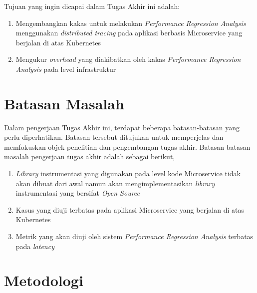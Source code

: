 Tujuan yang ingin dicapai dalam Tugas Akhir ini adalah:
\begin{enumerate}
	\item Mengembangkan kakas untuk melakukan \textit{Performance Regression Analysis} menggunakan \textit{distributed tracing}  pada aplikasi berbasis Microservice yang berjalan di atas Kubernetes
	\item Mengukur \textit{overhead} yang diakibatkan oleh kakas \textit{Performance Regression Analysis} pada level infrastruktur
\end{enumerate}


\section{Batasan Masalah}

Dalam pengerjaan Tugas Akhir ini, terdapat beberapa batasan-batasan yang perlu diperhatikan. Batasan tersebut ditujukan untuk memperjelas dan memfokuskan objek penelitian dan pengembangan tugas akhir. Batasan-batasan masalah pengerjaan tugas akhir adalah sebagai berikut,

\begin{enumerate}
	\item \textit{Library} instrumentasi yang digunakan pada level kode Microservice tidak akan dibuat dari awal namun akan mengimplementasikan \textit{library} instrumentasi yang bersifat \textit{Open Source}
	\item Kasus yang diuji terbatas pada aplikasi Microservice yang berjalan di atas Kubernetes
	\item Metrik yang akan diuji oleh sistem \textit{Performance Regression Analysis} terbatas pada \textit{latency}
\end{enumerate}

\section{Metodologi}

